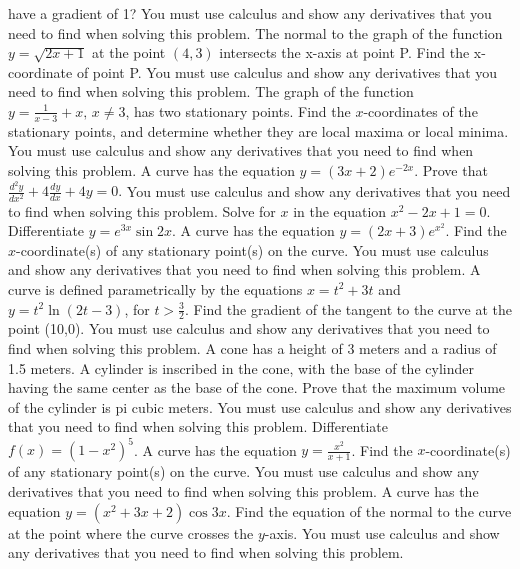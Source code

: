 \documentclass[12pt,addpoints]{exam}
\begin{document}
\begin{questions}
have a gradient of 1? You must use calculus and show any derivatives that you need to find when solving this problem.
\fillwithlines{3cm}
\question[5] The normal to the graph of the function \( y = \sqrt{2x+1} \) at the point \( (4,3) \) intersects the x-axis at point P. Find the x-coordinate of point P. You must use calculus and show any derivatives that you need to find when solving this problem.
\fillwithlines{3cm}
\question[5] The graph of the function \( y = \frac{1}{x-3} + x, \, x \neq 3 \), has two stationary points. Find the \( x \)-coordinates of the stationary points, and determine whether they are local maxima or local minima. You must use calculus and show any derivatives that you need to find when solving this problem.
\fillwithlines{3cm}
\question[5] A curve has the equation \( y = (3x + 2)e^{-2x} \). Prove that \(\frac{d^2 y}{dx^2} + 4 \frac{dy}{dx} + 4y = 0.\) You must use calculus and show any derivatives that you need to find when solving this problem.
\fillwithlines{3cm}
\question[5] Solve for \(x\) in the equation \(x^2 - 2x + 1 = 0\).
\fillwithlines{3cm}
\question[5] Differentiate \( y = e^{3x} \sin 2x \).
\fillwithlines{3cm}
\question[5] A curve has the equation \( y = (2x + 3)e^{x^2} \). Find the \( x \)-coordinate(s) of any stationary point(s) on the curve. You must use calculus and show any derivatives that you need to find when solving this problem.
\fillwithlines{3cm}
\question[5] A curve is defined parametrically by the equations \( x = t^2 + 3t \) and \( y = t^2 \ln(2t - 3) \), for \( t > \frac{3}{2} \). Find the gradient of the tangent to the curve at the point (10,0). You must use calculus and show any derivatives that you need to find when solving this problem.
\fillwithlines{3cm}
\question[5] A cone has a height of 3 meters and a radius of 1.5 meters. A cylinder is inscribed in the cone, with the base of the cylinder having the same center as the base of the cone. Prove that the maximum volume of the cylinder is pi cubic meters. You must use calculus and show any derivatives that you need to find when solving this problem.
\fillwithlines{3cm}
\question[5] Differentiate \( f(x) = (1 - x^2)^5 \).
\fillwithlines{3cm}
\question[5] A curve has the equation \( y = \frac{x^2}{x+1} \). Find the \( x \)-coordinate(s) of any stationary point(s) on the curve. You must use calculus and show any derivatives that you need to find when solving this problem.
\fillwithlines{3cm}
\question[5] A curve has the equation \( y = (x^2 + 3x + 2) \cos 3x \). Find the equation of the normal to the curve at the point where the curve crosses the \( y \)-axis. You must use calculus and show any derivatives that you need to find when solving this problem.

\end{questions}
\end{document}
